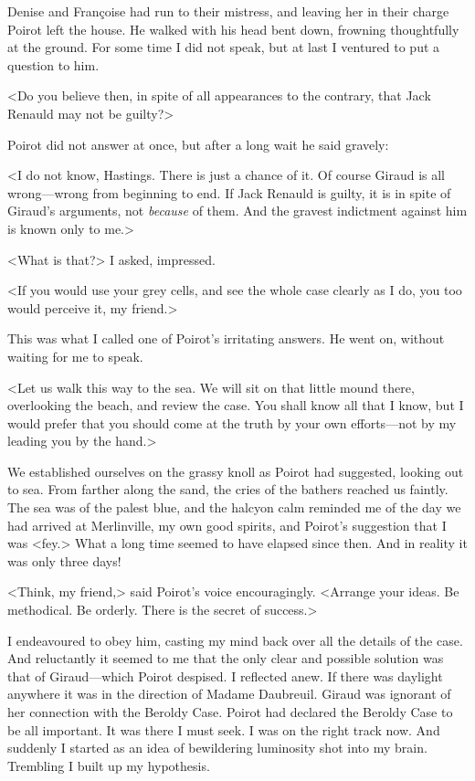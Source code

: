  Denise and Françoise had run to their mistress, and leaving her in their charge Poirot left the house. He walked with his head bent down, frowning thoughtfully at the ground. For some time I did not speak, but at last I ventured to put a question to him. 

 <Do you believe then, in spite of all appearances to the contrary, that Jack Renauld may not be guilty?> 

 Poirot did not answer at once, but after a long wait he said gravely: 

 <I do not know, Hastings. There is just a chance of it. Of course Giraud is all wrong—wrong from beginning to end. If Jack Renauld is guilty, it is in spite of Giraud's arguments, not \emph{because} of them. And the gravest indictment against him is known only to me.> 

 <What is that?> I asked, impressed. 

 <If you would use your grey cells, and see the whole case clearly as I do, you too would perceive it, my friend.> 

 This was what I called one of Poirot's irritating answers. He went on, without waiting for me to speak. 

 <Let us walk this way to the sea. We will sit on that little mound there, overlooking the beach, and review the case. You shall know all that I know, but I would prefer that you should come at the truth by your own efforts—not by my leading you by the hand.> 

 We established ourselves on the grassy knoll as Poirot had suggested, looking out to sea. From farther along the sand, the cries of the bathers reached us faintly. The sea was of the palest blue, and the halcyon calm reminded me of the day we had arrived at Merlinville, my own good spirits, and Poirot's suggestion that I was <fey.> What a long time seemed to have elapsed since then. And in reality it was only three days! 

 <Think, my friend,> said Poirot's voice encouragingly. <Arrange your ideas. Be methodical. Be orderly. There is the secret of success.> 

 I endeavoured to obey him, casting my mind back over all the details of the case. And reluctantly it seemed to me that the only clear and possible solution was that of Giraud—which Poirot despised. I reflected anew. If there was daylight anywhere it was in the direction of Madame Daubreuil. Giraud was ignorant of her connection with the Beroldy Case. Poirot had declared the Beroldy Case to be all important. It was there I must seek. I was on the right track now. And suddenly I started as an idea of bewildering luminosity shot into my brain. Trembling I built up my hypothesis. 

